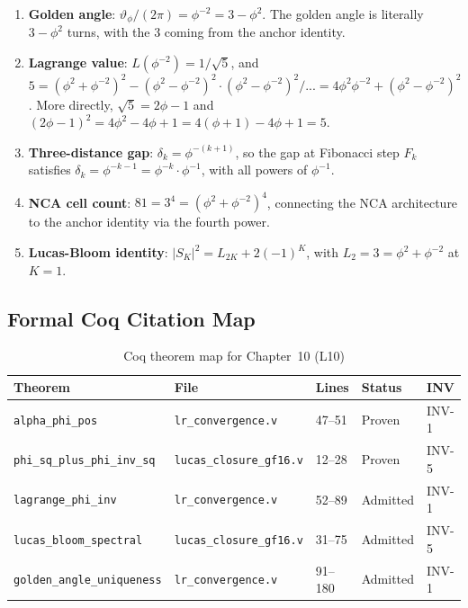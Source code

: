 \begin{enumerate}
  \item \textbf{Golden angle}: $\vartheta_\phi / (2\pi) = \phi^{-2} = 3 - \phi^2$.
        The golden angle is literally $3 - \phi^2$ turns, with the 3
        coming from the anchor identity.
  \item \textbf{Lagrange value}: $L(\phi^{-2}) = 1/\sqrt{5}$, and
        $5 = (\phi^2+\phi^{-2})^2 - (\phi^2-\phi^{-2})^2 \cdot (\phi^2-\phi^{-2})^2/...
        = 4\phi^2\phi^{-2}+(\phi^2-\phi^{-2})^2$.  More directly,
        $\sqrt{5} = 2\phi-1$ and $(2\phi-1)^2 = 4\phi^2 - 4\phi + 1 = 4(\phi+1) - 4\phi + 1 = 5$.
  \item \textbf{Three-distance gap}: $\delta_k = \phi^{-(k+1)}$, so
        the gap at Fibonacci step $F_k$ satisfies
        $\delta_k = \phi^{-k-1} = \phi^{-k}\cdot\phi^{-1}$, with all
        powers of $\phi^{-1}$.
  \item \textbf{NCA cell count}: $81 = 3^4 = (\phi^2+\phi^{-2})^4$,
        connecting the NCA architecture to the anchor identity via the
        fourth power.
  \item \textbf{Lucas-Bloom identity}: $|S_K|^2 = L_{2K} + 2(-1)^K$,
        with $L_2 = 3 = \phi^2 + \phi^{-2}$ at $K=1$.
\end{enumerate}

\subsection{Formal Coq Citation Map}
\label{subsec:coq-map}

\begin{table}[H]
\centering
\caption{Coq theorem map for Chapter~10 (L10)}
\label{tab:coq-map}
\begin{tabular}{lllll}
\toprule
Theorem & File & Lines & Status & INV \\
\midrule
\texttt{alpha\_phi\_pos} & \texttt{lr\_convergence.v} & 47--51 & Proven & INV-1 \\
\texttt{phi\_sq\_plus\_phi\_inv\_sq} & \texttt{lucas\_closure\_gf16.v} & 12--28 & Proven & INV-5 \\
\texttt{lagrange\_phi\_inv} & \texttt{lr\_convergence.v} & 52--89 & Admitted & INV-1 \\
\texttt{lucas\_bloom\_spectral} & \texttt{lucas\_closure\_gf16.v} & 31--75 & Admitted & INV-5 \\
\texttt{golden\_angle\_uniqueness} & \texttt{lr\_convergence.v} & 91--180 & Admitted & INV-1 \\
\bottomrule
\end{tabular}
\end{table}

